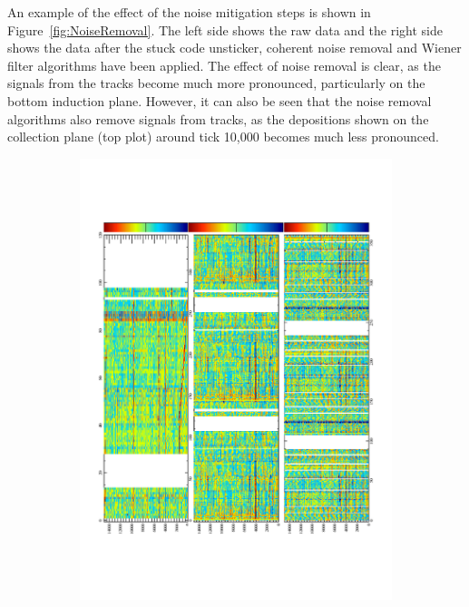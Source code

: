 An example of the effect of the noise mitigation steps is shown in Figure~\ref{fig:NoiseRemoval}. The left side shows the raw data and the right side shows the data after the stuck code unsticker, coherent noise removal and Wiener filter algorithms have been applied. The effect of noise removal is clear, as the signals from the tracks become much more pronounced, particularly on the bottom induction plane. However, it can also be seen that the noise removal algorithms also remove signals from tracks, as the depositions shown on the collection plane (top plot) around tick 10,000 becomes much less pronounced. \\

\begin{figure}[h!]
  \centering
  \begin{subfigure}{0.55\textwidth}
    \centering
    \includegraphics[width=\textwidth]{Evd_BeforeNoise}

\end{subfigure}
\end{figure}
